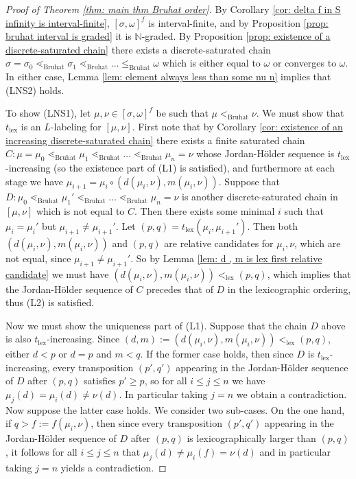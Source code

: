 \documentclass[oneside,11pt,reqno]{amsart}
\newcommand{\nn}{\ensuremath{\mathbb{N}}}
\theoremstyle{definition}
\newtheorem{proof techniques}{Proof Techniques}
\begin{document}
\begin{proof}[Proof of Theorem \ref{thm: main thm Bruhat order}]
By Corollary \ref{cor: delta f in S infinity is interval-finite}, $[\sigma , \omega]^f$ is interval-finite, and by Proposition \ref{prop: bruhat interval is graded} it is $\nn$-graded. By Proposition \ref{prop: existence of a discrete-saturated chain} there exists a discrete-saturated chain $\sigma = \sigma_0 \lessdot_\text{Bruhat} \sigma_1 \lessdot_\text{Bruhat} \ldots \leq_\text{Bruhat} \omega$ which is either equal to $\omega$ or converges to $\omega$. In either case, Lemma \ref{lem: element always less than some nu n} implies that (LNS2) holds. 

To show (LNS1), let $\mu , \nu \in [\sigma , \omega]^f$ be such that $\mu <_\text{Bruhat} \nu$. We must show that $t_\text{lex}$ is an $L$-labeling for $[ \mu , \nu]$. First note that by Corollary \ref{cor: existence of an increasing discrete-saturated chain} there exists a finite saturated chain $C: \mu = \mu_0 \lessdot_\text{Bruhat} \mu_1 \lessdot_\text{Bruhat} \ldots \lessdot_\text{Bruhat} \mu_n = \nu$ whose Jordan-H\"{o}lder sequence is $t_\text{lex}$-increasing (so the existence part of (L1) is satisfied), and furthermore at each stage we have $\mu_{i + 1} = \mu_i \circ (d(\mu_i , \nu), m(\mu_i , \nu))$. Suppose that $D: \mu_0 \lessdot_\text{Bruhat} \mu_1' \lessdot_\text{Bruhat} \ldots \lessdot_\text{Bruhat} \mu_n = \nu$ is another discrete-saturated chain in $[\mu , \nu]$ which is not equal to $C$. Then there exists some minimal $i$ such that $\mu_i = \mu_i'$ but $\mu_{i + 1} \neq \mu_{i + 1}'$. Let $(p , q) = t_\text{lex}(\mu_i , \mu_{i + 1}')$. Then both $(d (\mu_i , \nu) , m(\mu_i , \nu))$ and $(p , q)$ are relative candidates for $\mu_i , \nu$, which are not equal, since $\mu_{i + 1} \neq \mu_{i + 1}'$. So by Lemma \ref{lem: d , m is lex first relative candidate} we must have $(d (\mu_i , \nu), m(\mu_i , \nu))  <_\text{lex} (p , q)$, which implies that the Jordan-H\"{o}lder sequence of $C$ precedes that of $D$ in the lexicographic ordering, thus (L2) is satisfied.  

Now we must show the uniqueness part of (L1). Suppose that the chain $D$ above is also $t_\text{lex}$-increasing. Since $(d , m) := (d (\mu_i , \nu), m(\mu_i , \nu))  <_\text{lex} (p , q)$, either $d < p$ or $d = p$ and $m < q$. If the former case holds, then since $D$ is $t_\text{lex}$-increasing, every transposition $(p' , q')$ appearing in the Jordan-H\"{o}lder sequence of $D$ after $(p , q)$ satisfies $p' \geq p$, so for all $i \leq j \leq n$ we have $\mu_j(d) = \mu_i(d) \neq \nu(d)$. In particular taking $j = n$ we obtain a contradiction. Now suppose the latter case holds. We consider two sub-cases. On the one hand, if $q > f := f(\mu_i , \nu)$, then since every transposition $(p' , q')$ appearing in the Jordan-H\"{o}lder sequence of $D$ after $(p , q)$ is lexicographically larger than $(p , q)$, it follows for all $i \leq j \leq n$ that $\mu_j(d) \neq \mu_i(f) = \nu(d)$ and in particular taking $j = n$ yields a contradiction. 


\end{proof}
\end{document}
